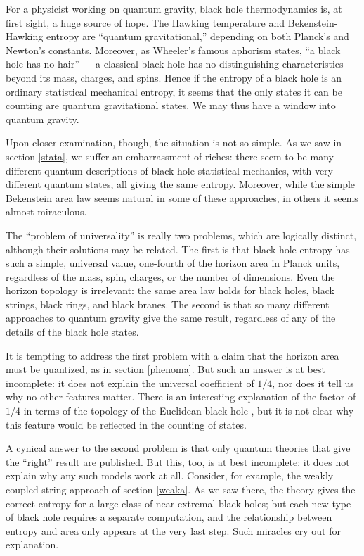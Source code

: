 \documentclass[11pt]{article}
\makeatletter
\def\section{\@startsection{section}{1}{\z@}{3.5ex plus 1ex minus
   .2ex}{2.3ex plus .2ex}{\large\bf}}
\makeatother
\begin{document}
\section{The problem of universality \label{universa}}

For a physicist working on quantum gravity,  black hole 
thermodynamics is, at first sight, a huge source of hope.
The Hawking temperature and Bekenstein-Hawking entropy are
``quantum gravitational,'' depending on both
Planck's and Newton's constants.  Moreover, as Wheeler's
famous aphorism states, ``a black hole has no hair'' ---  a classical
black hole has no  distinguishing characteristics 
beyond its mass, charges, and spins.  Hence if the entropy of a black 
hole is an ordinary statistical mechanical entropy, it seems that the 
only states it can be counting are quantum gravitational states.  We 
may thus have a window into quantum gravity.

Upon closer examination, though, the situation is not so simple.  As
we saw in section \ref{stata}, we suffer an embarrassment of riches: 
there seem to be many different quantum descriptions of black
hole statistical mechanics, with very different quantum
states, all giving the same entropy.  Moreover, while the simple
Bekenstein area law seems natural in some of these
approaches, in others it seems almost miraculous.

The ``problem of universality'' is really two problems, which are 
logically distinct, although their solutions may be related.  The
first is that black hole entropy has such a simple, universal value,
one-fourth of the horizon area in Planck units, regardless 
of the mass, spin, charges, or the number of dimensions.  Even
the horizon topology is irrelevant: the same area law holds for
black holes, black strings, black rings, and black branes.  The
second is that so many different approaches to quantum gravity
give the same result, regardless of any of the details of the
black hole states.

It is tempting to address the first problem with a claim 
that the horizon area must be quantized, as in section
\ref{phenoma}.  But such an answer is at best incomplete: it
does not explain the universal coefficient of $1/4$, nor does
it tell us why no other features matter.  There is an 
interesting explanation of the factor of $1/4$ in terms of the 
topology of the Euclidean black hole \cite{BTZa}, but it is not 
clear why this feature would be reflected in the counting of states.

A cynical answer to the second problem is that only quantum
theories that give the ``right'' result are published.
But this, too, is at best incomplete: it does not explain why any
such models work at all.  Consider, for example, the weakly 
coupled string approach of section \ref{weaka}.  As we saw
there, the theory gives the correct entropy for a large class of
near-extremal black holes; but each new type of black hole
requires a separate computation, and the relationship between
entropy and area only appears at the very last step.  Such  
miracles cry out for explanation.
\end{document}
